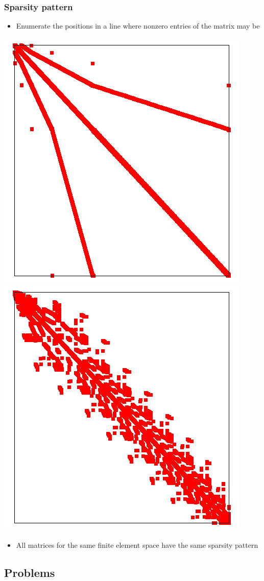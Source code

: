 \begin{frame}
  \frametitle{Sparsity pattern}
  \begin{itemize}
  \item Enumerate the positions in a line where nonzero entries of the matrix may be
  \end{itemize}
  \begin{center}
    \includegraphics[width=.4\textwidth]{graph/step-2-sparsity-1}
    \includegraphics[width=.4\textwidth]{graph/step-2-sparsity-2}
  \end{center}
  \begin{itemize}
  \item All matrices for the same finite element space have the same sparsity pattern
  \end{itemize}
\end{frame}

\subsection{Problems}


